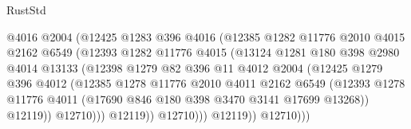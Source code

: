 \begin{lexlean}{RustStd}
\begin{coremodule}
                                  @4016
                                  @2004
                                  (@12425
                                    @1283
                                    @396
                                    @4016
                                    (@12385
                                      @1282
                                      @11776
                                      @2010
                                      @4015
                                      @2162
                                      @6549
                                      (@12393
                                        @1282
                                        @11776
                                        @4015
                                        (@13124
                                          @1281
                                          @180
                                          @398
                                          @2980
                                          @4014
                                          @13133
                                          (@12398
                                            @1279
                                            @82
                                            @396
                                            @11
                                            @4012
                                            @2004
                                            (@12425
                                              @1279
                                              @396
                                              @4012
                                              (@12385
                                                @1278
                                                @11776
                                                @2010
                                                @4011
                                                @2162
                                                @6549
                                                (@12393
                                                  @1278
                                                  @11776
                                                  @4011
                                                  (@17690 @846 @180 @398 @3470 @3141 @17699 @13268))
                                                @12119))
                                            @12710)))
                                      @12119))
                                  @12710)))
                            @12119))
                        @12710)))

\end{coremodule}
\end{lexlean}
